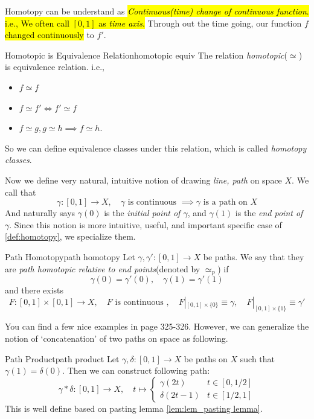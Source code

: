 \documentclass[12pt, a4paper, twoside]{article}
\theoremstyle{plain}
\begin{document}
Homotopy can be understand as \hl{\textit{Continuous(time) change of continuous function}. i.e., We 
often call $[0,1]$ as \textit{time axis}.}
Through out the time going, our function $f$ \hl{changed continuously} to $f'$. 

\begin{prop}{Homotopic is Equivalence Relation}{homotopic equiv}
    The relation \textit{homotopic}($\simeq$) is equivalence relation. i.e., 
    \begin{itemize}
        \item $f \simeq f$ 
        \item $f \simeq f' \iff f' \simeq f$ 
        \item $f \simeq g, g \simeq h \implies f \simeq h$. 
    \end{itemize}
\end{prop}

So we can define equivalence classes under this relation, which is called \textit{homotopy classes}. 

Now we define very natural, intuitive notion of drawing \textit{line, path} on space $X$. 
We call that 
\[\gamma: [0,1] \rightarrow X, \quad \gamma \text{ is continuous } \implies \gamma \text{ is a path on $X$}\]
And naturally says $\gamma(0)$ is the \textit{initial point of $\gamma$}, and $\gamma(1)$ is the \textit{end point of $\gamma$}. 
Since this notion is more intuitive, useful, and important specific case of \ref{def:homotopy}, we specialize them. 

\newpage 

\begin{defn}{Path Homotopy}{path homotopy}
    Let $\gamma, \gamma': [0,1] \rightarrow X$ be paths. 
    We say that they are \textit{path homotopic relative to end points}(denoted by $\simeq_p$)
    if 
    \[\gamma(0) = \gamma'(0), \quad \gamma(1) = \gamma'(1)\]
    and there exists 
    \[F: [0,1] \times [0,1] \rightarrow X, \quad F \text{ is continuous }, \quad F|_{[0,1] \times \{0\}} \equiv \gamma, \quad F|_{[0,1] \times \{1\}} \equiv \gamma'\]
\end{defn}

You can find a few nice examples in \cite{munkres} page 325-326. 
However, we can generalize the notion of \lq concatenation' of two paths on space as following. 

\begin{defn}{Path Product}{path product}
    Let $\gamma, \delta: [0,1] \rightarrow X$ be paths on $X$ such that $\gamma(1) = \delta(0)$. 
    Then we can construct following path: 
    \[\gamma * \delta: [0,1] \rightarrow X, \quad t \mapsto \begin{cases}
        \gamma(2t) & t \in [0,1/2] \\
        \delta(2t - 1) & t \in [1/2, 1]
    \end{cases}\]
    This is well define based on pasting lemma \ref{lem:lem_pasting lemma}. 
\end{defn}
\end{document}
